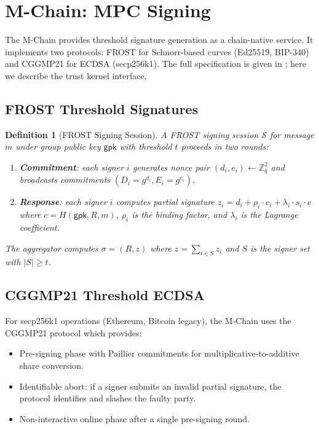 \documentclass[11pt,a4paper]{article}
\newtheorem{definition}{Definition}[section]
\begin{document}
\section{M-Chain: MPC Signing}\label{sec:mchain}

The M-Chain provides threshold signature generation as a chain-native service. It
implements two protocols: FROST for Schnorr-based curves (Ed25519, BIP-340) and
CGGMP21 for ECDSA (secp256k1). The full specification is given in
\cite{lux-mchain-mpc}; here we describe the trust kernel interface.

\subsection{FROST Threshold Signatures}

\begin{definition}[FROST Signing Session]\label{def:frost}
A FROST signing session $\mathcal{S}$ for message $m$ under group public key
$\mathsf{gpk}$ with threshold $t$ proceeds in two rounds:
\begin{enumerate}
    \item \textbf{Commitment}: each signer $i$ generates nonce pair
          $(d_i, e_i) \gets \mathbb{Z}_q^2$ and broadcasts commitments
          $(D_i = g^{d_i}, E_i = g^{e_i})$.
    \item \textbf{Response}: each signer $i$ computes partial signature
          $z_i = d_i + \rho_i \cdot e_i + \lambda_i \cdot s_i \cdot c$
          where $c = H(\mathsf{gpk}, R, m)$, $\rho_i$ is the binding factor,
          and $\lambda_i$ is the Lagrange coefficient.
\end{enumerate}
The aggregator computes $\sigma = (R, z)$ where $z = \sum_{i \in S} z_i$ and $S$
is the signer set with $|S| \geq t$.
\end{definition}

\subsection{CGGMP21 Threshold ECDSA}

For secp256k1 operations (Ethereum, Bitcoin legacy), the M-Chain uses the CGGMP21
protocol \cite{lux-mchain-mpc} which provides:
\begin{itemize}
    \item Pre-signing phase with Paillier commitments for multiplicative-to-additive
          share conversion.
    \item Identifiable abort: if a signer submits an invalid partial signature, the
          protocol identifies and slashes the faulty party.
    \item Non-interactive online phase after a single pre-signing round.
\end{itemize}
\end{document}

